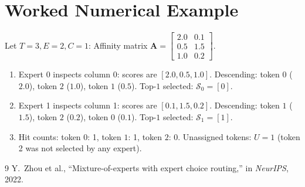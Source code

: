 \documentclass[11pt,a4paper]{article}
\theoremstyle{definition}
\begin{document}
\section{Worked Numerical Example}
Let $T = 3, E = 2, C = 1$:
Affinity matrix $\mathbf{A} = \begin{bmatrix} 2.0 & 0.1 \\ 0.5 & 1.5 \\ 1.0 & 0.2 \end{bmatrix}$.
\begin{enumerate}
    \item Expert 0 inspects column 0: scores are $[2.0, 0.5, 1.0]$.
    Descending: token $0$ ($2.0$), token $2$ ($1.0$), token $1$ ($0.5$).
    Top-$1$ selected: $\mathcal{S}_0 = [0]$.
    \item Expert 1 inspects column 1: scores are $[0.1, 1.5, 0.2]$.
    Descending: token $1$ ($1.5$), token $2$ ($0.2$), token $0$ ($0.1$).
    Top-$1$ selected: $\mathcal{S}_1 = [1]$.
    \item Hit counts: token $0$: 1, token $1$: 1, token $2$: 0.
    Unassigned tokens: $U = 1$ (token 2 was not selected by any expert).
\end{enumerate}

\begin{thebibliography}{9}
 Y.~Zhou et al., ``Mixture-of-experts with expert choice routing,'' in \emph{NeurIPS}, 2022.
\end{thebibliography}
\end{document}
